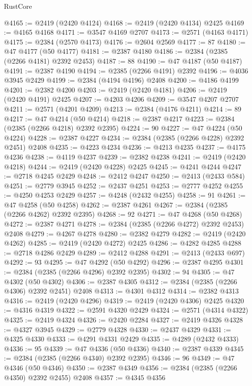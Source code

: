 \begin{lexlean}{RustCore}
\begin{coremodule}
@4165 := @2419 (@2420 @4124)
@4168 := @2419 (@2420 @4134) @2425
@4169 := @4165 @4168
@4171 := @3547 @4169 @2707
@4173 := @2571 (@4163 @4171)
@4175 := @2384 (@2570 @4173)
@4176 := @2604 @2569
@4177 := 87
@4180 := @47 @4177 (@50 @4177)
@4181 := @2387 @4180
@4186 := @2384 (@2385 (@2266 @4181) @2392 @2453)
@4187 := 88
@4190 := @47 @4187 (@50 @4187)
@4191 := @2387 @4190
@4194 := @2385 (@2266 @4191) @2392
@4196 := @4036 @3945 @2429
@4199 := @2384 (@4194 @4196) @2408
@4200 := @4186 @4199
@4201 := @2382 @4200
@4203 := @2419 (@2420 @4181)
@4206 := @2419 (@2420 @4191) @2425
@4207 := @4203 @4206
@4209 := @3547 @4207 @2707
@4211 := @2571 (@4201 @4209)
@4213 := @2384 (@4176 @4211)
@4214 := 89
@4217 := @47 @4214 (@50 @4214)
@4218 := @2387 @4217
@4223 := @2384 (@2385 (@2266 @4218) @2392 @2395)
@4224 := 90
@4227 := @47 @4224 (@50 @4224)
@4228 := @2387 @4227
@4234 := @2384 (@2385 (@2266 @4228) @2392 @2451) @2408
@4235 := @4223 @4234
@4236 := @4213 @4235
@4237 := @4175 @4236
@4238 := @4119 @4237
@4239 := @2382 @4238
@4241 := @2419 (@2420 @4218)
@4244 := @2419 (@2420 @4228) @2425
@4245 := @4241 @4244
@4247 := @2718 @4245 @2429
@4248 := @2412 @4247
@4250 := @2413 (@2433 @584)
@4251 := @2779 @3945
@4252 := @2437 @4251
@4253 := @2777 @4252
@4255 := @4250 @4253 @2429
@4257 := @4248 (@2432 @4255)
@4258 := 91
@4261 := @47 @4258 (@50 @4258)
@4262 := @2387 @4261
@4267 := @2384 (@2385 (@2266 @4262) @2392 @2395)
@4268 := 92
@4271 := @47 @4268 (@50 @4268)
@4272 := @2387 @4271
@4278 := @2384 (@2385 (@2266 @4272) @2392 @2453) @2408
@4279 := @4267 @4278
@4280 := @2382 @4279
@4282 := @2419 (@2420 @4262)
@4285 := @2419 (@2420 @4272) @2425
@4286 := @4282 @4285
@4288 := @2718 @4286 @2429
@4289 := @2412 @4288
@4291 := @2413 (@2433 @697)
@4292 := 93
@4295 := @47 @4292 (@50 @4292)
@4296 := @2387 @4295
@4301 := @2384 (@2385 (@2266 @4296) @2392 @2395)
@4302 := 94
@4305 := @47 @4302 (@50 @4302)
@4306 := @2387 @4305
@4312 := @2384 (@2385 (@2266 @4306) @2392 @2451) @2408
@4313 := @4301 @4312
@4314 := @2382 @4313
@4316 := @2419 (@2420 @4296)
@4319 := @2419 (@2420 @4306) @2425
@4320 := @4316 @4319
@4322 := @2591 @4320 @2429
@4324 := @2571 (@4314 @4322)
@4325 := @2419 @4324
@4326 := @2420 @2284
@4327 := @2419 @4326
@4328 := @4327 @3945
@4329 := @2779 @4328
@4330 := @2437 @4329
@4331 := @4325 @4330
@4333 := @4291 @4331 @2429
@4335 := @4289 (@2432 @4333)
@4336 := 95
@4339 := @47 @4336 (@50 @4336)
@4340 := @2387 @4339
@4345 := @2384 (@2385 (@2266 @4340) @2392 @2395)
@4346 := 96
@4349 := @47 @4346 (@50 @4346)
@4350 := @2387 @4349
@4356 := @2384 (@2385 (@2266 @4350) @2392 @2455) @2408
@4357 := @4345 @4356

\end{coremodule}
\end{lexlean}
